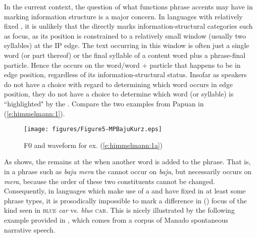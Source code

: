\documentclass[output=paper
,modfonts
,nonflat]{langsci/langscibook}
\begin{document}
In the current context, the question of what functions phrase accents may have in marking information structure is a major concern. In languages with relatively fixed , it is unlikely that the  directly marks information-structural categories such as focus, as its position is constrained to a relatively small window (usually two syllables) at the IP edge. The text occurring in this window is often just a single word (or part thereof) or the final syllable of a content word plus a phrase-final particle. Hence the  occurs on the word/word + particle that happens to be in edge position, regardless of its information-structural status. Insofar as speakers do not have a choice with regard to determining which word occurs in edge position, they do not have a choice to determine which word (or syllable) is “highlighted" by the . Compare the two examples from Papuan  in (\ref{e:himmelmann:1}).


\begin{figure}
	\texttt{[image: figures/Figure5-MPBajuKurz.eps]}
	\caption{F0 and waveform for ex. (\ref{e:himmelmann:1a}) \protect \footnotemark}
	\label{f5}
\end{figure}

\noindent
As  shows, the  remains at the  when another word is added to the phrase. That is, in a phrase such as \textit{baju mera} the  cannot occur on \textit{baju}, but necessarily occurs on \textit{mera}, because the order of these two constituents cannot be changed. Consequently, in languages which make use of a  and have fixed  in at least some phrase types, it is prosodically impossible to mark a difference in () focus of the kind seen in  \textsc{blue} \textit{car} vs. \textit{blue} \textsc{car}. This is nicely illustrated by the following example provided in \citet{Stoel2007}, which comes from a corpus of Manado  spontaneous narrative speech.
\end{document}
